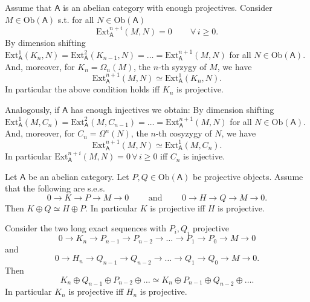 \begin{rem}[]
	Assume that $\mathsf{A}$ is an abelian category with enough projectives.
	Consider $M \in \mathrm{Ob} \left(\mathsf{A}\right)$ s.t. for all $N \in \mathrm{Ob} \left(\mathsf{A}\right)$
	\begin{equation}
		\mathrm{Ext}^{n+i}_{\mathsf{A}}(M,N) = 0 \qquad \,\forall\, i \geq 0
	.\end{equation} 
	By dimension shifting $\mathrm{Ext}^1_{\mathsf{A}}(K_n,N) = \mathrm{Ext}^2_{\mathsf{A}}(K_{n-1},N) =
	\ldots = \mathrm{Ext}^{n+1}_{\mathsf{A}}(M,N)$ for all $N \in \mathrm{Ob} \left(\mathsf{A}\right)$.
	And, moreover, for $K_n = \Omega_n(M)$, the $n$-th syzygy of $M$, we have
	\begin{equation}
		\mathrm{Ext}^{n+1}_{\mathsf{A}}(M,N) \simeq
		\mathrm{Ext}^1_{\mathsf{A}}(K_n,N)
	.\end{equation} 
	In particular the above condition holds iff $K_n$ is projective.

	Analogously, if $\mathsf{A}$ has enough injectives we obtain:
	By dimension shifting $\mathrm{Ext}^1_{\mathsf{A}}(M,C_n) = \mathrm{Ext}^2_{\mathsf{A}}(M,C_{n-1}) =
	\ldots = \mathrm{Ext}^{n+1}_{\mathsf{A}}(M,N)$ for all $N \in \mathrm{Ob} \left(\mathsf{A}\right)$.
	And, moreover, for $C_n = \Omega^n(N)$, the $n$-th cosyzygy of $N$, we have
	\begin{equation}
		\mathrm{Ext}^{n+1}_{\mathsf{A}}(M,N) \simeq
		\mathrm{Ext}^1_{\mathsf{A}}(M,C_n)
	.\end{equation} 
	In particular $\mathrm{Ext}^{n+i}_{\mathsf{A}}(M,N) = 0 \,\forall\, i \geq 0$
	iff $C_n$ is injective.
\end{rem}

\begin{lem}[Schanuel]
	Let $\mathsf{A}$ be an abelian category. Let $P,Q \in \mathrm{Ob} \left(\mathsf{A}\right)$
	be projective objects.
	Assume that the following are s.e.s.
	\begin{equation}
	0\to K\to P \to M \to 0
	\qquad \text{ and } \qquad
	0 \to H \to Q \to M \to 0
	.\end{equation} 
	Then $K \oplus Q \simeq H \oplus P$.
	In particular $K$ is projective iff $H$ is projective.
\end{lem} 
\begin{cor}
	Consider the two long exact sequences with $P_{i}, Q_{i}$ projective
	\begin{equation}
	0 \to K_n \to P_{n-1} \to P_{n-2} \to \ldots \to P_1 \to P_0 \to M \to 0
	\end{equation} 
	and
	\begin{equation}
	0 \to H_n \to Q_{n-1} \to Q_{n-2} \to \ldots \to Q_1 \to Q_0 \to M \to 0
	.\end{equation} 
	Then
	\begin{equation}
	K_n \oplus Q_{n-1} \oplus P_{n-2} \oplus \ldots \simeq
	K_n \oplus P_{n-1} \oplus Q_{n-2} \oplus \ldots
	.\end{equation} 
	In particular $K_n$ is projective iff $H_n$ is projective.
\end{cor} 

